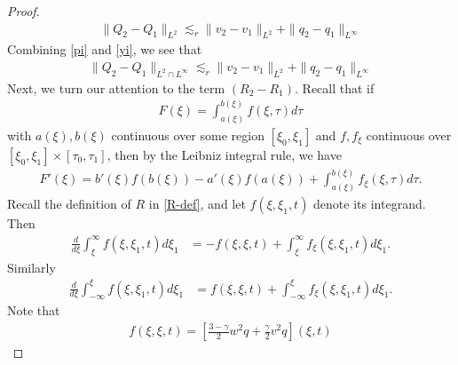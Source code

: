 \documentclass[12pt,reqno]{amsart}
\numberwithin{equation}{section}  %
\numberwithin{figure}{section}
\begin{document}
\begin{proof}
\begin{equation}
  \label{yi}
\begin{split}
  \| Q_{2} - Q_{1} \|_{L^{2}} \lesssim_{r} \| v_{2} - v_{1} \|_{L^{2}} + \| q_{2} - q_{1} \|_{L^{\infty}}
\end{split}
\end{equation}
%
%
Combining \eqref{pi} and \eqref{yi}, we see that
%
%
\begin{equation}
  \label{Q-diff-fin-est}
\begin{split}
  \| Q_{2} - Q_{1} \|_{L^{2} \cap L^{\infty}} \lesssim_{r} \| v_{2} - v_{1}
  \|_{L^{2}} + \| q_{2} - q_{1} \|_{L^{\infty}}
\end{split}
\end{equation}
%
%
Next, we turn our attention to the term 
$(R_{2} - R_{1})$. Recall that if
%
%
\begin{equation*}
\begin{split}
F(\xi) = \int_{a(\xi)}^{b(\xi)} f(\xi, \tau) d \tau
\end{split}
\end{equation*}
%
%
with $a(\xi), b(\xi)$ continuous over some region $[\xi_{0}, \xi_{1}]$ and $f, f_{\xi}$ continuous over $[\xi_{0}, \xi_{1}] \times [\tau_{0}, \tau_{1}]$, then by the Leibniz integral rule, we have
%
%
\begin{equation*}
\begin{split}
F'(\xi) = b'(\xi) f(b(\xi)) - a'(\xi) f(a(\xi)) + \int_{a(\xi)}^{b(\xi)} f_{\xi}(\xi, \tau) d \tau.
\end{split}
\end{equation*}
%
%
Recall the definition of $R$ in \eqref{R-def}, and let $f(\xi, \xi_{1}, t)$ denote
its integrand. Then
%
%
\begin{equation*}
\begin{split}
\frac{d}{d \xi} \int_{\xi}^{\infty}f(\xi, \xi_{1}, t) d \xi_{1}
& = -f(\xi, \xi, t) + \int_{\xi}^{\infty} f_{\xi}(\xi, \xi_{1}, t) d \xi_{1}.
\end{split}
\end{equation*}
%
%
Similarly
\begin{equation*}
\begin{split}
\frac{d}{d \xi} \int_{-\infty}^{\xi}f(\xi, \xi_{1}, t) d \xi_{1}
& = f(\xi, \xi, t) + \int_{-\infty}^{\xi} f_{\xi}(\xi, \xi_{1}, t) d \xi_{1}.
\end{split}
\end{equation*}
Note that
\begin{gather*}
    f(\xi, \xi, t) = \left [ \frac{3 - \gamma}{2}w^{2}q + \frac{\gamma}{2} v^{2} q \right ](\xi, t)

\end{gather*}
\end{proof}
\end{document}
